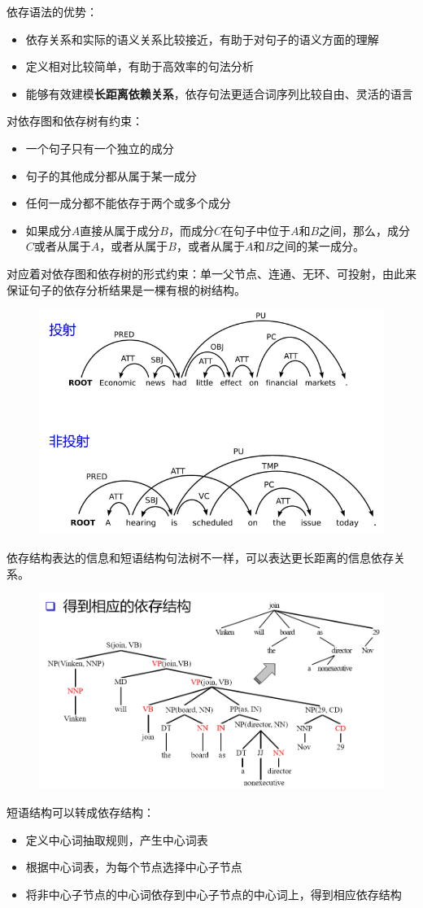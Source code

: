 依存语法的优势：
\begin{itemize}
	\item 依存关系和实际的语义关系比较接近，有助于对句子的语义方面的理解
	\item 定义相对比较简单，有助于高效率的句法分析
	\item 能够有效建模\textbf{长距离依赖关系}，依存句法更适合词序列比较自由、灵活的语言
\end{itemize}

对依存图和依存树有约束：
\begin{itemize}
\item 一个句子只有一个独立的成分
\item 句子的其他成分都从属于某一成分
\item 任何一成分都不能依存于两个或多个成分
\item 如果成分$A$直接从属于成分$B$，而成分$C$在句子中位于$A$和$B$之间，那么，成分$C$或者从属于$A$，或者从属于$B$，或者从属于$A$和$B$之间的某一成分。
\end{itemize}
对应着对依存图和依存树的形式约束：单一父节点、连通、无环、可投射，由此来保证句子的依存分析结果是一棵有根的树结构。
\begin{figure}[H]
\centering
\includegraphics[width=0.6\linewidth]{fig/projective.png}
\end{figure}

依存结构表达的信息和短语结构句法树不一样，可以表达更长距离的信息依存关系。
\begin{figure}[H]
\centering
\includegraphics[width=0.6\linewidth]{fig/dependency_tree.png}
\end{figure}

短语结构可以转成依存结构：
\begin{itemize}
	\item 定义中心词抽取规则，产生中心词表
	\item 根据中心词表，为每个节点选择中心子节点
	\item 将非中心子节点的中心词依存到中心子节点的中心词上，得到相应依存结构
\end{itemize}